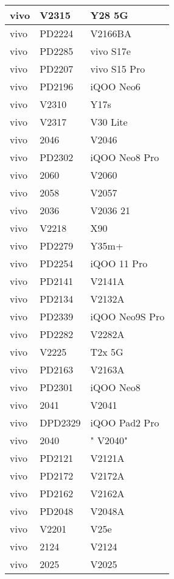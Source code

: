 \begin{tabularx}{\linewidth}{|l|X|X|}
        vivo & V2315 & Y28 5G \\ \hline
        vivo & PD2224 & V2166BA \\ \hline
        vivo & PD2285 & vivo S17e \\ \hline
        vivo & PD2207 & vivo S15 Pro \\ \hline
        vivo & PD2196 & iQOO Neo6 \\ \hline
        vivo & V2310 & Y17s \\ \hline
        vivo & V2317 & V30 Lite \\ \hline
        vivo & 2046 & V2046 \\ \hline
        vivo & PD2302 & iQOO Neo8 Pro \\ \hline
        vivo & 2060 & V2060 \\ \hline
        vivo & 2058 & V2057 \\ \hline
        vivo & 2036 & V2036 21 \\ \hline
        vivo & V2218 & X90 \\ \hline
        vivo & PD2279 & Y35m+ \\ \hline
        vivo & PD2254 & iQOO 11 Pro \\ \hline
        vivo & PD2141 & V2141A \\ \hline
        vivo & PD2134 & V2132A \\ \hline
        vivo & PD2339 & iQOO Neo9S Pro \\ \hline
        vivo & PD2282 & V2282A \\ \hline
        vivo & V2225 & T2x 5G \\ \hline
        vivo & PD2163 & V2163A \\ \hline
        vivo & PD2301 & iQOO Neo8 \\ \hline
        vivo & 2041 & V2041 \\ \hline
        vivo & DPD2329 & iQOO Pad2 Pro \\ \hline
        vivo & 2040 & "	V2040" \\ \hline
        vivo & PD2121 & V2121A \\ \hline
        vivo & PD2172 & V2172A \\ \hline
        vivo & PD2162 & V2162A \\ \hline
        vivo & PD2048 & V2048A \\ \hline
        vivo & V2201 & V25e \\ \hline
        vivo & 2124 & V2124 \\ \hline
        vivo & 2025 & V2025 \\ \hline

\end{tabularx}
